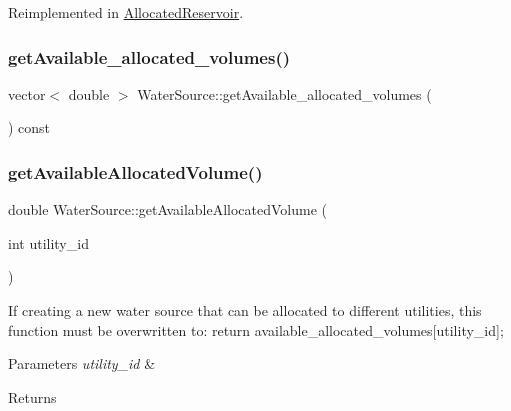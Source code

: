 Reimplemented in \mbox{\hyperlink{classAllocatedReservoir_aba81b93e1aa1154ce411248903fabde6_aba81b93e1aa1154ce411248903fabde6}{Allocated\+Reservoir}}.

\mbox{\label{classWaterSource_a1087f5f2458803fd1d37383e303bd25f_a1087f5f2458803fd1d37383e303bd25f}} 
\subsubsection{\texorpdfstring{get\+Available\+\_\+allocated\+\_\+volumes()}{getAvailable\_allocated\_volumes()}}
{\footnotesize\ttfamily vector$<$ double $>$ Water\+Source\+::get\+Available\+\_\+allocated\+\_\+volumes (\begin{DoxyParamCaption}{ }\end{DoxyParamCaption}) const}

\mbox{\label{classWaterSource_a42c687a3be3d88ba38dbea668c8d35cf_a42c687a3be3d88ba38dbea668c8d35cf}} 
\subsubsection{\texorpdfstring{get\+Available\+Allocated\+Volume()}{getAvailableAllocatedVolume()}}
{\footnotesize\ttfamily double Water\+Source\+::get\+Available\+Allocated\+Volume (\begin{DoxyParamCaption}\item[{int}]{utility\+\_\+id }\end{DoxyParamCaption})\hspace{0.3cm}{\ttfamily [virtual]}}

If creating a new water source that can be allocated to different utilities, this function must be overwritten to\+: return available\+\_\+allocated\+\_\+volumes\mbox{[}utility\+\_\+id\mbox{]}; 
\begin{DoxyParams}{Parameters}
{\em utility\+\_\+id} & \\
\hline
\end{DoxyParams}
\begin{DoxyReturn}{Returns}

\end{DoxyReturn}


